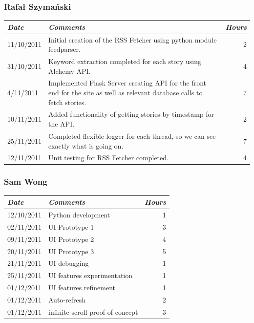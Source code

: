 \documentclass[a4paper,12pt]{article}
\begin{document}
	  \subsubsection{Rafał Szymański}
	    \begin{tabular}{l | p{10cm} r}
	     \emph{\large Date} & \emph{\large Comments} & \emph{\large Hours}\\
	     \hline
	     11/10/2011 & Initial creation of the RSS Fetcher using python module feedparser. & 2\\
       31/10/2011 & Keyword extraction completed for each story using Alchemy API. & 4\\
       4/11/2011 & Implemented Flask Server creating API for the front end for the site as well as relevant database calls to fetch stories. & 7\\
       10/11/2011 & Added functionality of getting stories by timestamp for the API. & 2\\
       25/11/2011 & Completed flexible logger for each thread, so we can see exactly what is going on. & 7\\
       12/11/2011 & Unit testing for RSS Fetcher completed. & 4
	    \end{tabular}
	  
	  \subsubsection{Sam Wong}
	  \begin{tabular}{l | p{10cm} r}
     \emph{\large Date} & \emph{\large Comments} & \emph{\large Hours}\\
     \hline
	   12/10/2011 & Python development & 1\\
     02/11/2011 & UI Prototype 1 & 3\\
     09/11/2011 & UI Prototype 2 & 4\\
     20/11/2011 & UI Prototype 3 & 5\\
     21/11/2011 & UI debugging & 1\\
     25/11/2011 & UI features experimentation & 1\\
     01/12/2011 & UI features refinement & 1\\
     01/12/2011 & Auto-refresh & 2\\
     01/12/2011 & infinite scroll proof of concept & 3\\
    \end{tabular}
  
\end{document}
